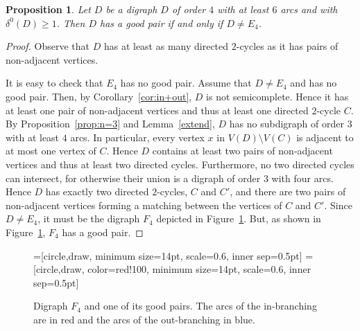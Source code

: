 \documentclass{article}
\newtheorem{proposition}[theorem]{Proposition}
\theoremstyle{definition}
\newcommand{\2}{\vspace{0.2cm}}
\begin{document}
\begin{proposition}\label{prop:small4}
Let $D$ be a digraph $D$ of order $4$ with at least $6$ arcs and with
$\delta^0(D)\geq 1$.  Then $D$ has a good pair if and only if $D\neq
E_4$.
\end{proposition}
\begin{proof}
Observe that $D$ has at least as many directed $2$-cycles as it has
pairs of non-adjacent vertices.

It is easy to check that $E_4$ has no good pair.  Assume that $D\neq
E_4$ and has no good pair.  Then, by Corollary~\ref{cor:in+out}, $D$
is not semicomplete. Hence it has at least one pair of non-adjacent
vertices and thus at least one directed $2$-cycle $C$.  By
Proposition~\ref{prop:n=3} and Lemma~\ref{extend}, $D$ has no
subdigraph of order $3$ with at least $4$ arcs.  In particular, every
vertex $x$ in $V(D)\setminus V(C)$ is adjacent to at most one vertex
of $C$.  Hence $D$ contains at least two pairs of non-adjacent
vertices and thus at least two directed cycles.  Furthermore, no two
directed cycles can intersect, for otherwise their union is a digraph
of order $3$ with four arcs.  Hence $D$ has exactly two directed
$2$-cycles, $C$ and $C'$, and there are two pairs of non-adjacent vertices
forming a matching between the vertices of $C$ and $C'$.  Since $D\neq
E_4$, it must be the digraph $F_4$ depicted in Figure~\ref{fig:F4}. But, as
shown in Figure~\ref{fig:F4}, $F_4$ has a good pair.
\end{proof}


\begin{figure}[H]
\begin{center}
=[circle,draw, minimum size=14pt, scale=0.6, inner sep=0.5pt]
=[circle,draw, color=red!100, minimum size=14pt, scale=0.6, inner sep=0.5pt]

\caption{Digraph $F_4$ and one of its good pairs. The arcs of the
  in-branching are in red and the arcs of the out-branching in
  blue.}\label{fig:F4}
\end{center}
\end{figure}
\end{document}
